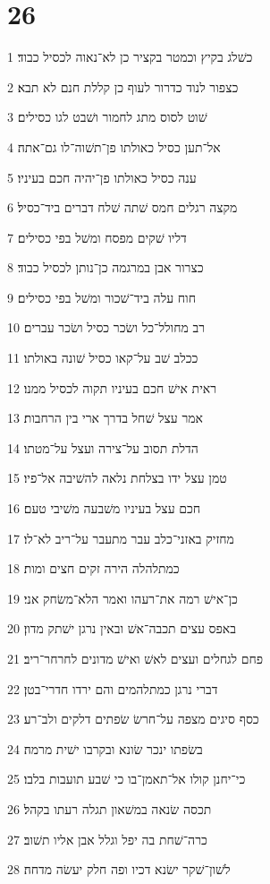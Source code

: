 \chapter{26}

\par 1 כשׁלג בקיץ וכמטר בקציר כן לא־נאוה לכסיל כבוד׃
\par 2 כצפור לנוד כדרור לעוף כן קללת חנם לא תבא׃
\par 3 שׁוט לסוס מתג לחמור ושׁבט לגו כסילים׃
\par 4 אל־תען כסיל כאולתו פן־תשׁוה־לו גם־אתה׃
\par 5 ענה כסיל כאולתו פן־יהיה חכם בעיניו׃
\par 6 מקצה רגלים חמס שׁתה שׁלח דברים ביד־כסיל׃
\par 7 דליו שׁקים מפסח ומשׁל בפי כסילים׃
\par 8 כצרור אבן במרגמה כן־נותן לכסיל כבוד׃
\par 9 חוח עלה ביד־שׁכור ומשׁל בפי כסילים׃
\par 10 רב מחולל־כל ושׂכר כסיל ושׂכר עברים׃
\par 11 ככלב שׁב על־קאו כסיל שׁונה באולתו׃
\par 12 ראית אישׁ חכם בעיניו תקוה לכסיל ממנו׃
\par 13 אמר עצל שׁחל בדרך ארי בין הרחבות׃
\par 14 הדלת תסוב על־צירה ועצל על־מטתו׃
\par 15 טמן עצל ידו בצלחת נלאה להשׁיבה אל־פיו׃
\par 16 חכם עצל בעיניו משׁבעה משׁיבי טעם׃
\par 17 מחזיק באזני־כלב עבר מתעבר על־ריב לא־לו׃
\par 18 כמתלהלה הירה זקים חצים ומות׃
\par 19 כן־אישׁ רמה את־רעהו ואמר הלא־משׂחק אני׃
\par 20 באפס עצים תכבה־אשׁ ובאין נרגן ישׁתק מדון׃
\par 21 פחם לגחלים ועצים לאשׁ ואישׁ מדונים לחרחר־ריב׃
\par 22 דברי נרגן כמתלהמים והם ירדו חדרי־בטן׃
\par 23 כסף סיגים מצפה על־חרשׂ שׂפתים דלקים ולב־רע׃
\par 24 בשׂפתו ינכר שׂונא ובקרבו ישׁית מרמה׃
\par 25 כי־יחנן קולו אל־תאמן־בו כי שׁבע תועבות בלבו׃
\par 26 תכסה שׂנאה במשׁאון תגלה רעתו בקהל׃
\par 27 כרה־שׁחת בה יפל וגלל אבן אליו תשׁוב׃
\par 28 לשׁון־שׁקר ישׂנא דכיו ופה חלק יעשׂה מדחה׃

